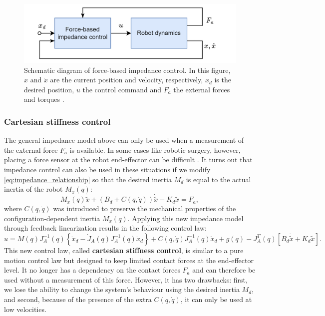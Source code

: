 \begin{figure}
  \centering
  \includegraphics[width=0.65\linewidth]{figures/force_impedance.png}

  \caption[Force-based impedance control diagram.]{Schematic diagram of force-based impedance control. In this figure, $x$ and $\dot{ x }$ are the current position and velocity, respectively, $x_d$ is the desired position, $u$ the control command and $F_a$ the external forces and torques \cite{ottCartesianImpedanceControl2008}.} \label{fig:force_based_impedance_control}
\end{figure}

\subsubsection{Cartesian stiffness control}

The general impedance model above can only be used when a measurement of the external force $F_a$ is available. In some cases like robotic surgery, however, placing a force sensor at the robot end-effector can be difficult \cite{ferragutiTankbasedApproachImpedance2013}. It turns out that impedance control can also be used in these situations if we modify \eqref{eq:impedance_relationship} so that the desired inertia $M_d$ is equal to the actual inertia of the robot $M_x\left( q \right)$:
\begin{equation}
  M_x \left( q \right)\ddot{\widetilde{ x }}+ \left( B_d + C \left( q ,\dot{ q }\right)\right)\dot{\widetilde{ x }}+ K_d \widetilde{ x } = F_a,
\end{equation}
where $C \left( q ,\dot{ q }\right)$ was introduced to preserve the mechanical properties of the configuration-dependent inertia $M_x \left( q \right)$. Applying this new impedance model through feedback linearization results in the following control law:
\begin{equation}
  u = M\left(q \right)J_A^{-1}\left(q\right)\left\{\ddot{x}_d - \dot{J}_A \left(q\right)J_A^{-1}\left(q\right)\dot{x}_d\right\} + C \left(q,\dot{q}\right)J_A^{-1}\left(q\right)\dot{x}_d + g \left( q \right) - J_ A^T \left( q \right)\left[B_d\dot{\widetilde{ x }} + K_d \widetilde{ x }\right].
\end{equation}
This new control law, called \textbf{cartesian stiffness control}, is similar to a pure motion control law but designed to keep limited contact forces at the end-effector level. It no longer has a dependency on the contact forces $F_a$ and can therefore be used without a measurement of this force. However, it has two drawbacks: first, we lose the ability to change the system's behaviour using the desired inertia $M_d$, and second, because of the presence of the extra $C \left( q ,\dot{ q }\right)$, it can only be used at low velocities.

